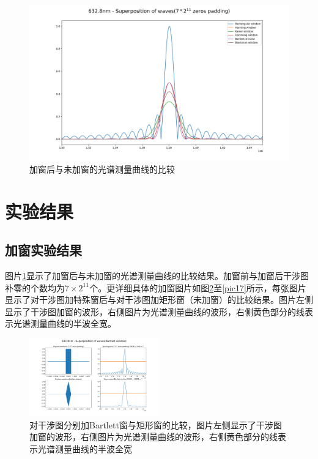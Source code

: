 \documentclass[conference]{IEEEtran}
\begin{document}
\begin{figure}[htbp]
	\centerline{
		\includegraphics[width=22cm]{pic7.png} 	
	}
	\caption{加窗后与未加窗的光谱测量曲线的比较}
	\label{pic7}
\end{figure}

\section{实验结果}

\subsection{加窗实验结果}
图片\ref{pic7}显示了加窗后与未加窗的光谱测量曲线的比较结果。加窗前与加窗后干涉图补零的个数均为$7\times2^{11}$个。更详细具体的加窗图片如图\ref{pic13}至\ref{pic17}所示，每张图片显示了对干涉图加特殊窗后与对干涉图加矩形窗（未加窗）的比较结果。图片左侧显示了干涉图加窗的波形，右侧图片为光谱测量曲线的波形，右侧黄色部分的线表示光谱测量曲线的半波全宽。
\begin{figure}[htbp]
    \centerline{\includegraphics[width=0.5\textwidth]{Bartlett.png}}
    \caption{对干涉图分别加Bartlett窗与矩形窗的比较，图片左侧显示了干涉图加窗的波形，右侧图片为光谱测量曲线的波形，右侧黄色部分的线表示光谱测量曲线的半波全宽}
    \label{pic13}
\end{figure}
\end{document}
